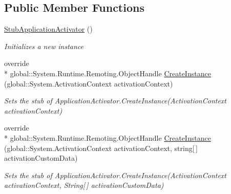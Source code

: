 \subsection*{Public Member Functions}
\begin{DoxyCompactItemize}
\item 
\hyperlink{class_system_1_1_runtime_1_1_hosting_1_1_fakes_1_1_stub_application_activator_a68edcf44159ffcf6f80a11e16df41de8}{Stub\-Application\-Activator} ()
\begin{DoxyCompactList}\small\item\em Initializes a new instance\end{DoxyCompactList}\item 
override \\*
global\-::\-System.\-Runtime.\-Remoting.\-Object\-Handle \hyperlink{class_system_1_1_runtime_1_1_hosting_1_1_fakes_1_1_stub_application_activator_ae997ae310840ca84a3abece529aedf3b}{Create\-Instance} (global\-::\-System.\-Activation\-Context activation\-Context)
\begin{DoxyCompactList}\small\item\em Sets the stub of Application\-Activator.\-Create\-Instance(\-Activation\-Context activation\-Context)\end{DoxyCompactList}\item 
override \\*
global\-::\-System.\-Runtime.\-Remoting.\-Object\-Handle \hyperlink{class_system_1_1_runtime_1_1_hosting_1_1_fakes_1_1_stub_application_activator_a686cc6d8904ee189ef80ef9090e1c0a9}{Create\-Instance} (global\-::\-System.\-Activation\-Context activation\-Context, string\mbox{[}$\,$\mbox{]} activation\-Custom\-Data)
\begin{DoxyCompactList}\small\item\em Sets the stub of Application\-Activator.\-Create\-Instance(\-Activation\-Context activation\-Context, String\mbox{[}$\,$\mbox{]} activation\-Custom\-Data)\end{DoxyCompactList}\end{DoxyCompactItemize}
